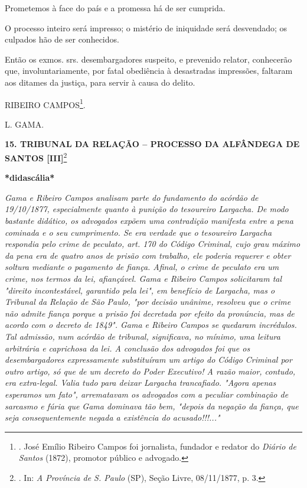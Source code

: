 Prometemos à face do país e a promessa há de ser cumprida.

O processo inteiro será impresso; o mistério de iniquidade será
desvendado; os culpados hão de ser conhecidos.

Então os exmos. srs. desembargadores suspeito, e prevenido relator,
conhecerão que, involuntariamente, por fatal obediência à desastradas
impressões, faltaram aos ditames da justiça, para servir à causa do
delito.

RIBEIRO CAMPOS\footnote{. José Emílio Ribeiro Campos foi jornalista,
  fundador e redator do \emph{Diário de Santos} (1872), promotor público
  e advogado.}.

\protect\hypertarget{Secao_Sem_Titulo-20}{}{}L. GAMA.

\textbf{15. TRIBUNAL DA RELAÇÃO -- PROCESSO DA ALFÂNDEGA DE SANTOS
{[}III{]}}\footnote{. In: \emph{A Província de S. Paulo} (SP), Seção
  Livre, 08/11/1877, p. 3.}

\textbf{*didascália*}

\emph{Gama e Ribeiro Campos analisam parte do fundamento do acórdão de
19/10/1877, especialmente quanto à punição do tesoureiro Largacha. De
modo bastante didático, os advogados expõem uma contradição manifesta
entre a pena cominada e o seu cumprimento. Se era verdade que o
tesoureiro Largacha respondia pelo crime de peculato, art. 170 do Código
Criminal, cujo grau máximo da pena era de quatro anos de prisão com
trabalho, ele poderia requerer e obter soltura mediante o pagamento de
fiança. Afinal, o crime de peculato era um crime, nos termos da lei,
afiançável. Gama e Ribeiro Campos solicitaram tal "direito
incontestável, garantido pela lei", em benefício de Largacha, mas o
Tribunal da Relação de São Paulo, "por decisão unânime, resolveu que o
crime não admite fiança porque a prisão foi decretada por efeito da
pronúncia, mas de acordo com o decreto de 1849". Gama e Ribeiro Campos
se quedaram incrédulos. Tal admissão, num acórdão de tribunal,
significava, no mínimo, uma leitura arbitrária e caprichosa da lei. A
conclusão dos advogados foi que os desembargadores expressamente
substituíram um artigo do Código Criminal por outro artigo, só que de um
decreto do Poder Executivo! A razão maior, contudo, era extra-legal.
Valia tudo para deixar Largacha trancafiado. "Agora apenas esperamos um
fato", arrematavam os advogados com a peculiar combinação de sarcasmo e
fúria que Gama dominava tão bem, "depois da negação da fiança, que seja
consequentemente negada a existência do acusado!!!..."}

